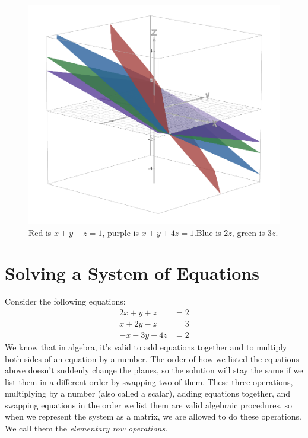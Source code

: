 \documentclass[12pt]{scrartcl}
\begin{document}
\begin{figure}[H]
    \centering
    \includegraphics[scale=0.6]{Coefficient Affects Slope in that Axis.png}
    \caption*{Red is $x+y+z=1$, \: purple is $x+y+4z=1$.\quad Blue is $2z$, \: green is $3z$.}
\end{figure}

\section*{Solving a System of Equations}
Consider the following equations:
\begin{align*}
    2x + y + z &= 2 \\
    x + 2y - z &= 3 \\
    -x - 3y + 4z &= 2
\end{align*}
We know that in algebra, it's valid to add equations together and to multiply both sides of an equation by a number. The order of how we listed the equations above doesn't suddenly change the planes, so the solution will stay the same if we list them in a different order by swapping two of them. These three operations, multiplying by a number (also called a scalar), adding equations together, and swapping equations in the order we list them are valid algebraic procedures, so when we represent the system as a matrix, we are allowed to do these operations. We call them the \textit{elementary row operations}.
\end{document}
